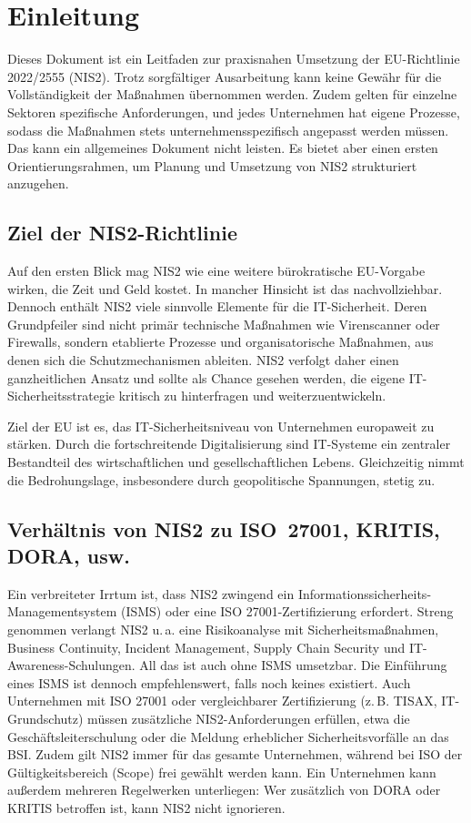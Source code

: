 \section{Einleitung}
Dieses Dokument ist ein Leitfaden zur praxisnahen Umsetzung der EU-Richtlinie 2022/2555 (NIS2). Trotz sorgfältiger Ausarbeitung kann keine Gewähr für die Vollständigkeit der Maßnahmen übernommen werden. Zudem gelten für einzelne Sektoren spezifische Anforderungen, und jedes Unternehmen hat eigene Prozesse, sodass die Maßnahmen stets unternehmensspezifisch angepasst werden müssen. Das kann ein allgemeines Dokument nicht leisten. Es bietet aber einen ersten Orientierungsrahmen, um Planung und Umsetzung von NIS2 strukturiert anzugehen.


\subsection{Ziel der NIS2-Richtlinie}
Auf den ersten Blick mag NIS2 wie eine weitere bürokratische EU-Vorgabe wirken, die Zeit und Geld kostet. In mancher Hinsicht ist das nachvollziehbar. Dennoch enthält NIS2 viele sinnvolle Elemente für die IT-Sicherheit. Deren Grundpfeiler sind nicht primär technische Maßnahmen wie Virenscanner oder Firewalls, sondern etablierte Prozesse und organisatorische Maßnahmen, aus denen sich die Schutzmechanismen ableiten. NIS2 verfolgt daher einen ganzheitlichen Ansatz und sollte als Chance gesehen werden, die eigene IT-Sicherheitsstrategie kritisch zu hinterfragen und weiterzuentwickeln.

Ziel der EU ist es, das IT-Sicherheitsniveau von Unternehmen europaweit zu stärken. Durch die fortschreitende Digitalisierung sind IT-Systeme ein zentraler Bestandteil des wirtschaftlichen und gesellschaftlichen Lebens. Gleichzeitig nimmt die Bedrohungslage, insbesondere durch geopolitische Spannungen, stetig zu.

\subsection{Verhältnis von NIS2 zu ISO~27001, KRITIS, DORA, usw.}
Ein verbreiteter Irrtum ist, dass NIS2 zwingend ein Informationssicherheits-Managementsystem (ISMS) oder eine ISO 27001-Zertifizierung erfordert. Streng genommen verlangt NIS2 u.\,a. eine Risikoanalyse mit Sicherheitsmaßnahmen, Business Continuity, Incident Management, Supply Chain Security und IT-Awareness-Schulungen. All das ist auch ohne ISMS umsetzbar. Die Einführung eines ISMS ist dennoch empfehlenswert, falls noch keines existiert.
\newpage
Auch Unternehmen mit ISO 27001 oder vergleichbarer Zertifizierung (z.\,B. TISAX, IT-Grundschutz) müssen zusätzliche NIS2-Anforderungen erfüllen, etwa die Geschäftsleiterschulung oder die Meldung erheblicher Sicherheitsvorfälle an das BSI. Zudem gilt NIS2 immer für das gesamte Unternehmen, während bei ISO der Gültigkeitsbereich (Scope) frei gewählt werden kann. Ein Unternehmen kann außerdem mehreren Regelwerken unterliegen: Wer zusätzlich von DORA oder KRITIS betroffen ist, kann NIS2 nicht ignorieren.

